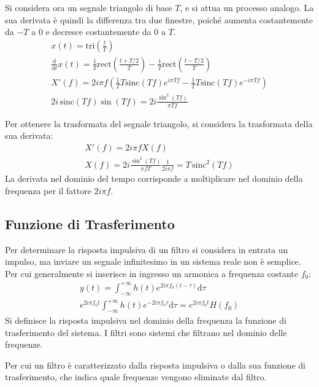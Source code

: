 \documentclass{article}
\newcommand{\rect}{\mathrm{rect}}
\newcommand{\sinc}{\mathrm{sinc}}
\newcommand{\tri}{\mathrm{tri}}
\newcommand{\df}{\mathrm{d}}
\numberwithin{equation}{subsection}
\begin{document}
Si considera ora un segnale triangolo di base $T$, e si attua un processo analogo. La sua derivata è quindi la differenza tra due finestre, poiché aumenta costantemente da 
$-T$ a $0$ e decresce costantemente da $0$ a $T$. 
\begin{gather*}
    x(t)=\tri \displaystyle\left(\frac{t}{T}\right)\\
    \displaystyle\frac{\df}{\df t}x(t)=\frac{1}{T}\rect\left(\frac{t+T/2}{T}\right)-\frac{1}{T}\rect\left(\frac{t-T/2}{T}\right)\\
    X'(f)=2i\pi f\displaystyle\left(\frac{1}{T}T\sinc(Tf)e^{i\pi Tf}-\frac{1}{T}T\sinc(Tf)e^{-i\pi Tf}\right)\\
    2i\,\sinc(Tf)\sin(Tf)=\displaystyle2i\frac{\sin^2(Tf)}{\pi Tf}
\end{gather*}

Per ottenere la trasformata del segnale triangolo, si considera la trasformata della sua derivata:
\begin{gather*}
    X'(f)=2i\pi fX(f)\\
    X(f)=\displaystyle2i\frac{\sin^2(Tf)}{\pi fT}\frac{1}{2i\pi f}=T\,\sinc^2(Tf)
\end{gather*}
La derivata nel dominio del tempo corrisponde a moltiplicare nel dominio della frequenza per il fattore $2i\pi f$. 

\subsection{Funzione di Trasferimento}

Per determinare la risposta impulsiva di un filtro si considera in entrata un impulso, ma inviare un segnale infinitesimo in un sistema reale non è semplice. Per cui generalmente 
si inserisce in ingresso un armonica a frequenza costante $f_0$:
\begin{gather*}
    y(t)=\displaystyle\int_{-\infty}^{+\infty}h(t)e^{2i\pi f_0(t-\tau)}\df\tau\\
    e^{2i\pi f_0t}\displaystyle\int_{-\infty}^{+\infty}h(t)e^{-2i\pi f_0\tau}\df\tau=e^{2i\pi f_0t}H(f_0)
\end{gather*}
Si definisce la risposta impulsiva nel dominio della frequenza la funzione di trasferimento del sistema. I filtri sono sistemi che filtrano nel dominio delle frequenze. 

Per cui un filtro è caratterizzato dalla risposta impulsiva o dalla sua funzione di trasferimento, che indica quale frequenze vengono eliminate dal filtro. 
\end{document}
